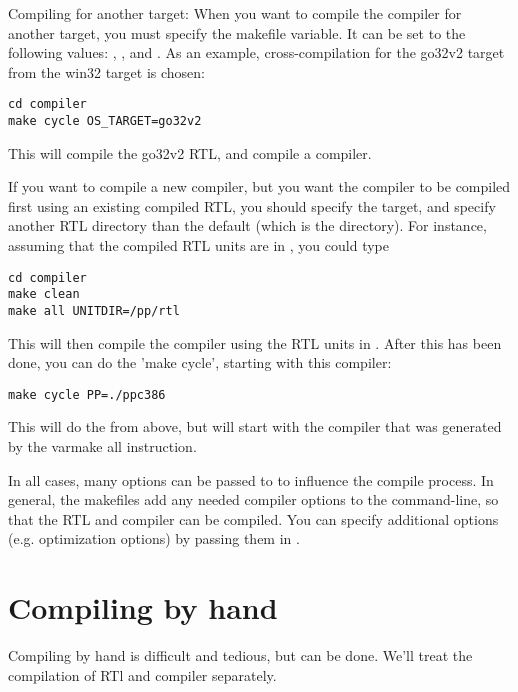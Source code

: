 \documentclass{report}
\begin{document}
Compiling for another target:
When you want to compile the compiler for another target, you must specify
the  makefile variable. It can be set to the following
values: , ,  and .
As an example, cross-compilation for the go32v2 target from the win32 target
is chosen:
\begin{verbatim}
cd compiler
make cycle OS_TARGET=go32v2
\end{verbatim}
This will compile the go32v2 RTL, and compile a  compiler.

If you want to compile a new compiler, but you want the compiler to be
compiled first using an existing compiled RTL, you should specify the
 target, and specify another RTL directory than the default (which
is the  directory). For instance, assuming that
the compiled RTL units are in , you could type
\begin{verbatim}
cd compiler
make clean
make all UNITDIR=/pp/rtl
\end{verbatim}

This will then compile the compiler using the RTL units in .
After this has been done, you can do the 'make cycle', starting with this
compiler:
\begin{verbatim}
make cycle PP=./ppc386
\end{verbatim}
This will do the  from above, but will start with the compiler
that was generated by the var{make all} instruction.

In all cases, many options can be passed to  to influence the
compile process. In general, the makefiles add any needed compiler options
to the command-line, so that the RTL and compiler can be compiled. You can
specify additional options (e.g. optimization options) by passing them in
.

\section{Compiling by hand}

Compiling by hand is difficult and tedious, but can be done. We'll treat the
compilation of RTl and compiler separately.
\end{document}
